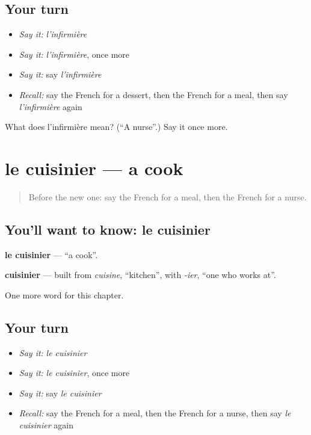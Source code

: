 \subsection*{Your turn}
\begin{itemize}
\raggedright
  \item \emph{Say it:} \emph{l'infirmière}
  \item \emph{Say it:} \emph{l'infirmière}, once more
  \item \emph{Say it:} say \emph{l'infirmière}
  \item \emph{Recall:} say the French for a dessert, then the French for a meal, then say \emph{l'infirmière} again
\end{itemize}

\begin{tcolorbox}[breakable,colback=teal!4,colframe=teal!35!black,title={Before you move on}]
What does l'infirmière mean? (\textquotedblleft{}A nurse\textquotedblright{}.) Say it once more.
\end{tcolorbox}
\section[le cuisinier]{le cuisinier — a cook}

\label{lesson:FR-C123-cuisinier}



\begin{quote}
Before the new one: say the French for a meal, then the French for a nurse.
\end{quote}

\subsection*{You'll want to know: le cuisinier}
\textbf{le cuisinier} — \textquotedblleft{}a cook\textquotedblright{}.

\begin{cousinweb}
\textbf{cuisinier} — built from \emph{cuisine}, \textquotedblleft{}kitchen\textquotedblright{}, with \emph{-ier}, \textquotedblleft{}one who works at\textquotedblright{}.
\end{cousinweb}

\begin{grammarlens}[title={What you've built}]
One more word for this chapter.
\end{grammarlens}

\subsection*{Your turn}
\begin{itemize}
\raggedright
  \item \emph{Say it:} \emph{le cuisinier}
  \item \emph{Say it:} \emph{le cuisinier}, once more
  \item \emph{Say it:} say \emph{le cuisinier}
  \item \emph{Recall:} say the French for a meal, then the French for a nurse, then say \emph{le cuisinier} again
\end{itemize}

